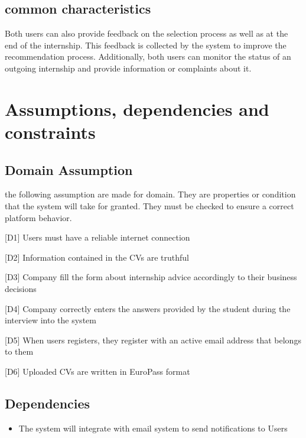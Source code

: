 		\subsection{common characteristics}
			Both users can also provide feedback on the selection process as well as at the end of the internship. This feedback is collected by the system to improve the recommendation process. Additionally, both users can monitor the status of an outgoing internship and provide information or complaints about it.
		
	\section{Assumptions, dependencies and constraints}
		\subsection{Domain Assumption}
			the following assumption are made for domain. They are properties or condition that the system will take for granted. They must be checked to ensure a correct platform behavior.
			
			[D1] Users must have a reliable internet connection
			
			[D2] Information contained in the CVs are truthful
			
			[D3] Company fill the form about internship advice accordingly to their business decisions
			
			[D4] Company correctly enters the answers provided by the student during the interview into the system
			
			[D5] When users registers, they register with an active email address that belongs to them
			
			[D6] Uploaded CVs are written in EuroPass format
			
		\subsection{Dependencies}
			\begin{itemize}
				\item The system will integrate with email system to send notifications to Users
			\end{itemize}
		
